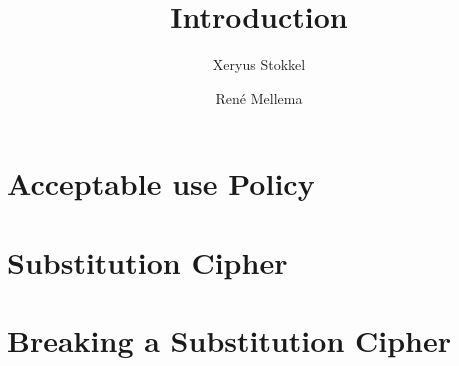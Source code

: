 \documentclass[a4paper, 10pt]{article}
\title{Introduction}
\author{Xeryus Stokkel \and Ren\'e Mellema}
\date{} %
\begin{document}
\maketitle

\section{Acceptable use Policy}

\section{Substitution Cipher}

\section{Breaking a Substitution Cipher}
\end{document}
